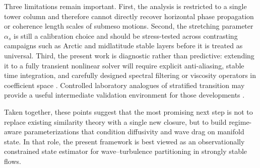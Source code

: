 \documentclass[11pt,a4paper]{article}
\begin{document}
Three limitations remain important. First, the analysis is restricted to a single tower column and therefore cannot directly recover horizontal phase propagation or coherence length scales of submeso motions. Second, the stretching parameter $\alpha_s$ is still a calibration choice and should be stress-tested across contrasting campaigns such as Arctic and midlatitude stable layers before it is treated as universal. Third, the present work is diagnostic rather than predictive: extending it to a fully transient nonlinear solver will require explicit anti-aliasing, stable time integration, and carefully designed spectral filtering or viscosity operators in coefficient space \citep{Halila2019, Kaur2023, Pellegrino2023}. Controlled laboratory analogues of stratified transition may provide a useful intermediate validation environment for those developments \citep{Lefauve2025}.

Taken together, these points suggest that the most promising next step is not to replace existing similarity theory with a single new closure, but to build regime-aware parameterizations that condition diffusivity and wave drag on manifold state. In that role, the present framework is best viewed as an observationally constrained state estimator for wave--turbulence partitioning in strongly stable flows.


\end{document}
